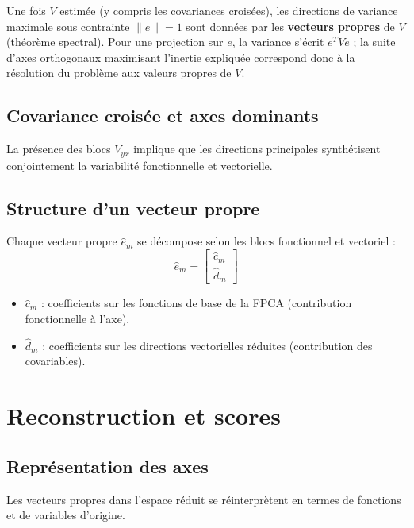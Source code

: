 \documentclass[11pt, a4paper]{article}
\begin{document}
Une fois $V$ estimée (y compris les covariances croisées), les directions de
variance maximale sous contrainte $\|e\|=1$ sont données par les
\textbf{vecteurs propres} de $V$ (théorème spectral). Pour une projection sur
$e$, la variance s'écrit $e^T V e$ ; la suite d'axes orthogonaux maximisant
l'inertie expliquée correspond donc à la résolution du problème aux valeurs
propres de $V$.

\subsection{Covariance croisée et axes dominants}
La présence des blocs $V_{yx}$ implique que les directions principales
synthétisent conjointement la variabilité fonctionnelle et vectorielle.

\subsection{Structure d'un vecteur propre}
Chaque vecteur propre $\hat{e}_m$ se décompose selon les blocs fonctionnel et
vectoriel :
\begin{equation}
\hat{e}_m = \begin{bmatrix} \hat{c}_m \\ \hat{d}_m \end{bmatrix}
\end{equation}
\begin{itemize}
    \item \textbf{$\hat{c}_m$} : coefficients sur les fonctions de base de la
    FPCA (contribution fonctionnelle à l'axe).
    \item \textbf{$\hat{d}_m$} : coefficients sur les directions vectorielles
    réduites (contribution des covariables).
\end{itemize}

\section{Reconstruction et scores}

\subsection{Représentation des axes}
Les vecteurs propres dans l'espace réduit se réinterprètent en termes de
fonctions et de variables d'origine.
\end{document}
